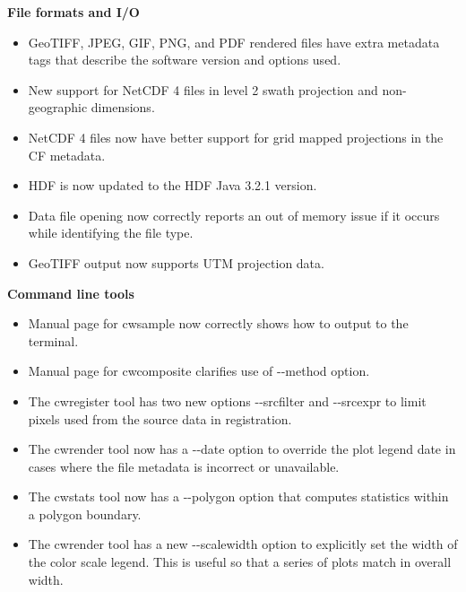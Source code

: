 \hspace{0.4cm} {\bf File formats and I/O}

\begin{itemize}

  \item GeoTIFF, JPEG, GIF, PNG, and PDF rendered files have extra metadata tags
  that describe the software version and options used.

  \item New support for NetCDF 4 files in level 2 swath projection and
  non-geographic dimensions.

  \item NetCDF 4 files now have better support for grid mapped projections in
  the CF metadata.

  \item HDF is now updated to the HDF Java 3.2.1 version.

  \item Data file opening now correctly reports an out of memory issue if it
  occurs while identifying the file type.

  \item GeoTIFF output now supports UTM projection data.

\end{itemize}

\hspace{0.4cm} {\bf Command line tools}

\begin{itemize}

  \item Manual page for cwsample now correctly shows how to output to the
  terminal.

  \item Manual page for cwcomposite clarifies use of -{-}method option.

  \item The cwregister tool has two new options -{-}srcfilter and -{-}srcexpr
  to limit pixels used from the source data in registration.

  \item The cwrender tool now has a -{-}date option to override the plot legend
  date in cases where the file metadata is incorrect or unavailable.

  \item The cwstats tool now has a -{-}polygon option that computes statistics
  within a polygon boundary.

  \item The cwrender tool has a new -{-}scalewidth option to explicitly set the
  width of the color scale legend.  This is useful so that a series of plots
  match in overall width.

\end{itemize}

